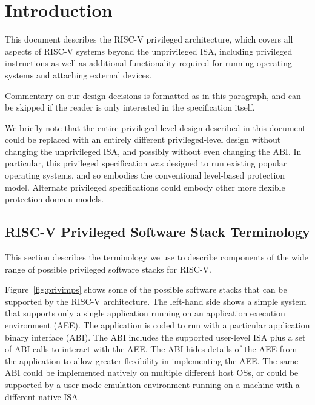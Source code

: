 \chapter{Introduction}

This document describes the RISC-V privileged architecture, which
covers all aspects of RISC-V systems beyond the unprivileged ISA,
including privileged instructions as well as additional functionality
required for running operating systems and attaching external devices.

\begin{commentary}
Commentary on our design decisions is formatted as in this paragraph,
and can be skipped if the reader is only interested in the
specification itself.
\end{commentary}

\begin{commentary}
We briefly note that the entire privileged-level design described in
this document could be replaced with an entirely different
privileged-level design without changing the unprivileged ISA, and
possibly without even changing the ABI.  In particular, this
privileged specification was designed to run existing popular
operating systems, and so embodies the conventional level-based
protection model.  Alternate privileged specifications could embody
other more flexible protection-domain models.
\end{commentary}

\section{RISC-V Privileged Software Stack Terminology}

This section describes the terminology we use to describe components
of the wide range of possible privileged software stacks for RISC-V.

Figure~\ref{fig:privimps} shows some of the possible software stacks
that can be supported by the RISC-V architecture.  The left-hand side
shows a simple system that supports only a single application running
on an application execution environment (AEE).  The application is
coded to run with a particular application binary interface (ABI).
The ABI includes the supported user-level ISA plus a set of ABI calls to
interact with the AEE.  The ABI hides details of the AEE from the
application to allow greater flexibility in implementing the AEE.  The
same ABI could be implemented natively on multiple different host OSs,
or could be supported by a user-mode emulation environment running on
a machine with a different native ISA.

